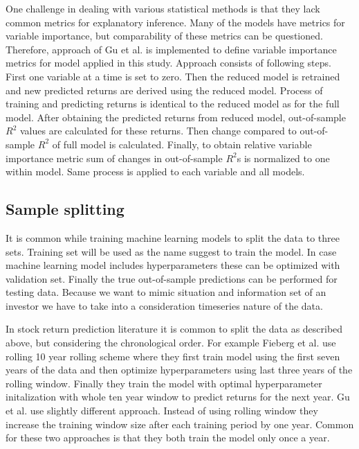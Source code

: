 \documentclass{article}
\begin{document}
One challenge in dealing with various statistical methods is that they lack common metrics for explanatory inference. Many of the models have metrics for variable importance, but comparability of these metrics can be questioned. Therefore, approach of Gu et al. \citeyear{guetal} is implemented to define variable importance metrics for model applied in this study. Approach consists of following steps. First one variable at a time is set to zero. Then the reduced model is retrained and new predicted returns are derived using the reduced model. Process of training and predicting returns is identical to the reduced model as for the full model. After obtaining the predicted returns from reduced model, out-of-sample $R^2$ values are calculated for these returns. Then change compared to out-of-sample $R^2$ of full model is calculated. Finally, to obtain relative variable importance metric sum of changes in out-of-sample $R^2$s is normalized to one within model. Same process is applied to each variable and all models.

\subsection{Sample splitting} \label{SampleSplitting}

It is common while training machine learning models to split the data to three sets. Training set will be used as the name suggest to train the model. In case machine learning model includes hyperparameters these can be optimized with validation set. Finally the true out-of-sample predictions can be performed for testing data. Because we want to mimic situation and information set of an investor we have to take into a consideration timeseries nature of the data. 

In stock return prediction literature it is common to split the data as described above, but considering the chronological order. For example Fieberg et al. \citeyear{Fieberg} use rolling 10 year rolling scheme where they first train model using the first seven years of the data and then optimize hyperparameters using last three years of the rolling window. Finally they train the model with optimal hyperparameter initalization with whole ten year window to predict returns for the next year. Gu et al. \citeyear{guetal} use slightly different approach. Instead of using rolling window they increase the training window size after each training period by one year. Common for these two approaches is that they both train the model only once a year.
\end{document}
